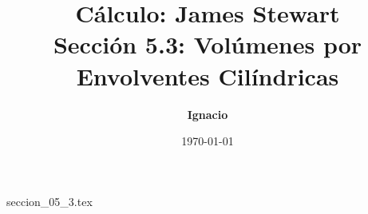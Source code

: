 \documentclass[11pt,spanish,oneside]{report}
\title{\textbf{Cálculo: James Stewart} \\ \Large Sección 5.3: Volúmenes por Envolventes Cilíndricas}
\author{\textbf{Ignacio}}
\date{\today}
\begin{document}
\maketitle

{seccion_05_3.tex}
\end{document}
